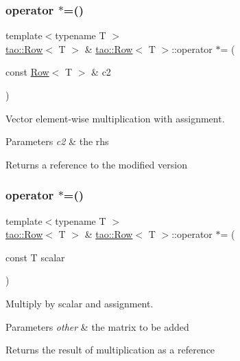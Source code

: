 \subsubsection{\texorpdfstring{operator $\ast$=()}{operator *=()}\hspace{0.1cm}{\footnotesize\ttfamily [1/2]}}
{\footnotesize\ttfamily template$<$typename T $>$ \\
\mbox{\hyperlink{classtao_1_1_row}{tao\+::\+Row}}$<$ T $>$ \& \mbox{\hyperlink{classtao_1_1_row}{tao\+::\+Row}}$<$ T $>$\+::operator $\ast$= (\begin{DoxyParamCaption}\item[{const \mbox{\hyperlink{classtao_1_1_row}{Row}}$<$ T $>$ \&}]{c2 }\end{DoxyParamCaption})}



Vector element-\/wise multiplication with assignment. 


\begin{DoxyParams}{Parameters}
{\em c2} & the rhs \\
\hline
\end{DoxyParams}
\begin{DoxyReturn}{Returns}
a reference to the modified version 
\end{DoxyReturn}
\mbox{\label{classtao_1_1_row_a7a46e0ed2c119a5baff222df3c565413}} 
\subsubsection{\texorpdfstring{operator $\ast$=()}{operator *=()}\hspace{0.1cm}{\footnotesize\ttfamily [2/2]}}
{\footnotesize\ttfamily template$<$typename T $>$ \\
\mbox{\hyperlink{classtao_1_1_row}{tao\+::\+Row}}$<$ T $>$ \& \mbox{\hyperlink{classtao_1_1_row}{tao\+::\+Row}}$<$ T $>$\+::operator $\ast$= (\begin{DoxyParamCaption}\item[{const T}]{scalar }\end{DoxyParamCaption})}



Multiply by scalar and assignment. 


\begin{DoxyParams}{Parameters}
{\em other} & the matrix to be added \\
\hline
\end{DoxyParams}
\begin{DoxyReturn}{Returns}
the result of multiplication as a reference 
\end{DoxyReturn}
\mbox{\label{classtao_1_1_row_af40ce96ba7f24cfbed041fe15792a476}} 
